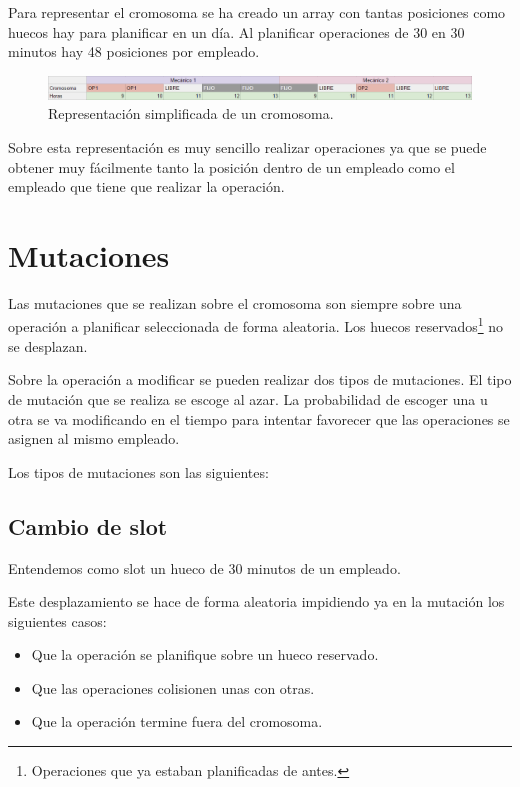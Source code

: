 \documentclass[11pt]{article}
\begin{document}
	Para representar el cromosoma se ha creado un array con tantas posiciones como huecos hay para planificar en un día. Al planificar operaciones de 30 en 30 minutos hay 48 posiciones por empleado.
	
	\begin{figure}[h]
		\centering
		\includegraphics[width= 12.5cm]{cromosoma.png}
		\caption{Representación simplificada de un cromosoma.}
	\end{figure}
	
	
	Sobre esta representación es muy sencillo realizar operaciones ya que se puede obtener muy fácilmente tanto la posición dentro de un empleado como el empleado que tiene que realizar la operación.
	
	\section{Mutaciones}
	Las mutaciones que se realizan sobre el cromosoma son siempre sobre una operación a planificar seleccionada de forma aleatoria. Los huecos reservados\footnote{Operaciones que ya estaban planificadas de antes.} no se desplazan.
	
	Sobre la operación a modificar se pueden realizar dos tipos de mutaciones. El tipo de mutación que se realiza se escoge al azar. La probabilidad de escoger una u otra se va modificando en el tiempo para intentar favorecer que las operaciones se asignen al mismo empleado.
	
	Los tipos de mutaciones son las siguientes:
	
	\subsection{Cambio de slot}
	
	Entendemos como slot un hueco de 30 minutos de un empleado.
	
	Este desplazamiento se hace de forma aleatoria impidiendo ya en la mutación los siguientes casos:
	
	\begin{itemize}
		\item Que la operación se planifique sobre un hueco reservado.
		\item Que las operaciones colisionen unas con otras.
		\item Que la operación termine fuera del cromosoma.
	\end{itemize}
	
\end{document}
